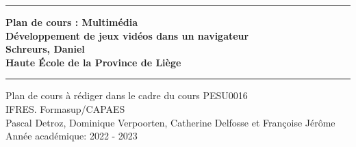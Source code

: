 \newcommand{\JMUTitle}[9]{
    \thispagestyle{empty}
    \vspace*{\stretch{1}}
    {\parindent0cm
        \rule{\linewidth}{.7ex}}
    \begin{flushright}
        \vspace*{\stretch{1}}
        \bfseries\Huge
        #1\\
        \vspace*{\stretch{0.2}}
        \bfseries\Large
        #2\\
        \vspace*{\stretch{1}}
        \bfseries\large
        #4\\
        \vspace*{\stretch{1}}
        \bfseries\large
        #9
    \end{flushright}
    \rule{\linewidth}{.7ex}

    \vspace*{\stretch{1}}
    \begin{center}
        \vspace*{\stretch{1}}
        \Large #3 \\

        \vspace*{\stretch{2}}
        \large IFRES. Formasup/CAPAES\\
        \vspace*{\stretch{1}}
        \large   #8 \\[1mm]
        \large Année académique: #5 - #6
    \end{center}
}
\JMUTitle
{Plan de cours : Multimédia}                                %
{Développement de jeux vidéos dans un navigateur}                            %
{Plan de cours à rédiger dans le cadre du cours PESU0016}       %
{Schreurs, Daniel }                              %
{2022}                                      %
{2023}                                      %
{Bachelor/Master Wirtschaftsinformatik}           %
{Pascal Detroz, Dominique Verpoorten, Catherine Delfosse et Françoise Jérôme}                       %
{Haute École de la Province de Liège}                                        %
\clearpage